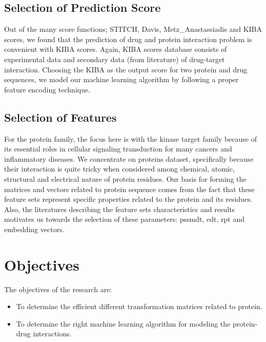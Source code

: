 \subsection{Selection of Prediction Score}

Out of the many score functions; STITCH, Davis, Metz\_Anastassiadis and KIBA scores, we found that the prediction of drug and protein interaction problem is convenient with KIBA scores. Again, KIBA scores database consists of experimental data and secondary data (from literature) of drug-target interaction. Choosing the KIBA as the output score for two protein and drug sequences, we model our machine learning algorithm by following a proper feature encoding technique.

\subsection{Selection of Features}

For the protein family, the focus here is with the kinase target family because of its essential roles in cellular signaling transduction for many cancers and inflammatory diseases. We concentrate on proteins dataset, specifically because their interaction is quite tricky when considered among chemical, atomic, structural and electrical nature of protein residues. Our basis for forming the matrices and vectors related to protein sequence comes from the fact that these feature sets represent specific properties related to the protein and its residues. Also, the literatures describing the feature sets characteristics and results motivates us towards the selection of these parameters: \acrshort{pssmdt}, \acrshort{edt}, \acrshort{rpt} and embedding vectors.


\section{Objectives}
The objectives of the research are:
\begin{itemize}
    \item To determine the efficient different transformation matrices related to protein.
    \item To determine the right machine learning algorithm for modeling the protein-drug interactions.
\end{itemize}




